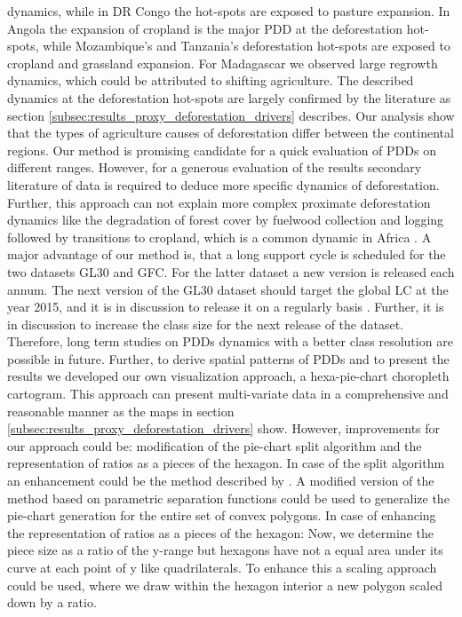 dynamics, while in DR Congo the hot-spots are exposed to pasture expansion. In Angola the expansion of cropland is the major \ac{PDD} at the deforestation hot-spots, while Mozambique's and Tanzania's deforestation hot-spots are exposed to cropland and grassland expansion. For Madagascar we observed large regrowth dynamics, which could be attributed to shifting agriculture. The described dynamics at the deforestation hot-spots are largely confirmed by the literature as section \ref{subsec:results_proxy_deforestation_drivers} describes. Our analysis show that the types of agriculture causes of deforestation differ between the continental regions. Our method is promising candidate for a quick evaluation of \acp{PDD} on different ranges. However, for a generous evaluation of the results secondary literature of data is required to deduce more specific dynamics of deforestation. Further, this approach can not explain more complex proximate deforestation dynamics like the degradation of forest cover by fuelwood collection and logging followed by transitions to cropland, which is a common dynamic in Africa \citep{Geist2001,Cabral2011}. A major advantage of our method is, that a long support cycle is scheduled for the two datasets \ac{GL30} and \ac{GFC}. For the latter dataset a new version is released each annum. The next version of the \ac{GL30} dataset should target the global \ac{LC} at the year 2015, and it is in discussion to release it on a regularly basis \citep{Chen2017}. Further, it is in discussion to increase the class size for the next release of the dataset. Therefore, long term studies on \acp{PDD} dynamics with a better class resolution are possible in future. Further, to derive spatial patterns of \acp{PDD} and to present the results we developed our own visualization approach, a hexa-pie-chart choropleth cartogram. This approach can present multi-variate data in a comprehensive and reasonable manner as the maps in section \ref{subsec:results_proxy_deforestation_drivers} show. However, improvements for our approach could be: modification of the pie-chart split algorithm and the representation of ratios as a pieces of the hexagon. In case of the split algorithm an enhancement could be the method described by \citet{Skala1994}. A modified version of the method based on parametric separation functions could be used to generalize the pie-chart generation for the entire set of convex polygons. In case of enhancing the representation of ratios as a pieces of the hexagon: Now, we determine the piece size as a ratio of the y-range but hexagons have not a equal area under its curve at each point of y like quadrilaterals. To enhance this a scaling approach could be used, where we draw within the hexagon interior a new polygon scaled down by a ratio.

